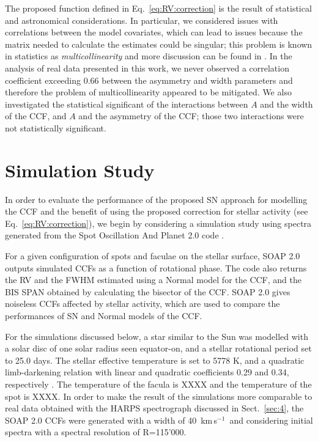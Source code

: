 \documentclass{aa}
\def\kms{\hbox{\,km\,s$^{-1}$}}       %
\begin{document}
The proposed function defined in Eq.~\eqref{eq:RV:correction} is the result of statistical and astronomical considerations. 
In particular, we considered issues with correlations between the model covariates, which can lead to issues because the matrix needed to calculate the estimates could be singular; this problem is known in statistics as \emph{multicollinearity} and more discussion can be found in \citet{belsley1991}.
In the analysis of real data presented in this work, we never observed a correlation coefficient exceeding $0.66$ between the asymmetry and width parameters and therefore the problem of multicollinearity appeared to be mitigated. 
We also investigated the statistical significant of the interactions between $A$ and the width of the CCF, and $A$ and the asymmetry of the CCF; those two interactions were not statistically significant.

\section{Simulation Study} \label{sec:soap}
In order to evaluate the performance of the proposed SN approach for modelling the CCF and the benefit of using the proposed correction for stellar activity (see Eq.~\eqref{eq:RV:correction}), we begin by considering a simulation study using spectra generated from the Spot Oscillation And Planet 2.0 code \citep[SOAP 2.0,][]{Dumusque-2014b}.

For a given configuration of spots and faculae on the stellar surface, SOAP 2.0 outputs simulated CCFs as a function of rotational phase. 
The code also returns the RV and the FWHM estimated using a Normal model for the CCF, and the BIS SPAN obtained by calculating the bisector of the CCF. 
SOAP 2.0 gives noiseless CCFs affected by stellar activity, which are used to compare the performances of SN and Normal models of the CCF.

For the simulations discussed below, a star similar to the Sun was modelled with a solar disc of one solar radius seen equator-on, and a stellar rotational period set to 25.0 days.
The stellar effective temperature is set to 5778 K, and a quadratic limb-darkening relation with linear and quadratic coefficients 0.29 and 0.34, respectively \citep[][]{Oshagh-2013a, Claret-2011}.
{\color{magenta} The temperature of the facula is XXXX and the temperature of the spot is XXXX.}
In order to make the result of the simulations more comparable to real data obtained with the HARPS spectrograph discussed in Sect.~\ref{sec:4}, the SOAP 2.0 CCFs were generated with a width of 40 \kms\, and considering initial spectra with a spectral resolution of R=115'000.
\end{document}
